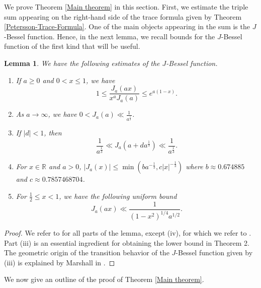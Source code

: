 \documentclass[reqno]{amsart}
\theoremstyle{plain}
\newtheorem{lemma}[theorem]{Lemma}
\theoremstyle{definition}
\theoremstyle{remark}
\begin{document}
We prove Theorem \ref{Main theorem} in this section.  First, we estimate the triple sum appearing on the right-hand side of the trace formula given by Theorem \ref{Petersson-Trace-Formula}. One of the main objects appearing in the sum is the $J$-Bessel function. Hence,
in the next lemma, we recall bounds for the $J$-Bessel function of the first kind that will be useful. 
\begin{lemma}\label{Bessel-estimate}
We have the following estimates of the $J$-Bessel function. 
\begin{enumerate}[label=(\roman*)]
    \item \label{Bessel-estimate-part-1} If $a \geq 0$ and $0<x\leq 1$, we have $$1\leq \frac{J_a(ax)}{x^aJ_a(a)}\leq e^{a(1-x)}.$$
    \item \label{Bessel-estimate-part-2}   As $a\rightarrow \infty $, we have $0<J_a(a) \ll \frac{1}{a^{\frac{1}{3}}}$. 
    \item \label{Bessel-estimate-part-3}  If $|d|<1$, then $$\frac{1}{a^{\frac{1}{3}}} \ll  J_a(a+da^{\frac{1}{3}})\ll \frac{1}{a^{\frac{1}{3}}}. $$
    \item \label{Bessel-estimate-part-4}  For $x\in \mathbb{R}$ and $a > 0$, $|J_a(x)|\leq \min(ba^{-\frac{1}{3}},c|x|^{-\frac{1}{3}})$ where $b \approx 0.674885$ and $c \approx 0.7857468704$. 
    \item \label{Bessel-estimate-part-5} For $\frac{1}{2} \leq x<1 $, we have the following uniform bound $$J_a(ax)\ll \frac{1}{(1-x^2)^{1/4}a^{1/2}}. $$
\end{enumerate}
\end{lemma}

\begin{proof}
We refer to \cite[\S 2.1.1]{JS}  for all parts of the lemma, except (iv), for which we refer to \cite[\S 1]{LJ}. Part (iii) is an essential ingredient for obtaining the lower bound in Theorem 2. The geometric origin of the transition behavior of the $J$-Bessel function given by (iii) is explained by Marshall in \cite[\S 5]{JS}.
\end{proof}

We now give an outline of the proof of Theorem \ref{Main theorem}.
\end{document}
